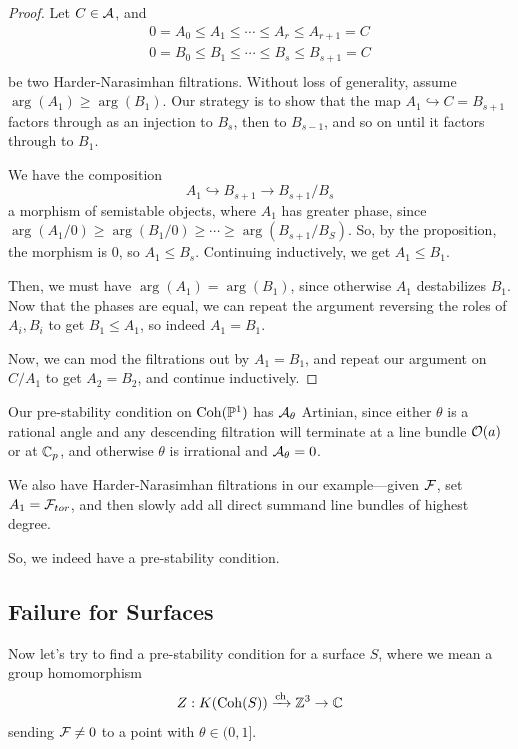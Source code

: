 \documentclass[12pt]{article}
\begin{document}
\begin{proof}
    Let $C\in \mathcal{A}$, and
    \begin{align*}
        0=A_0 \leq A_1 \leq \cdots \leq A_r \leq A_{r+1}=C\\
        0=B_0 \leq B_1 \leq \cdots \leq B_s \leq B_{s+1}=C\\
    \end{align*}
    be two Harder-Narasimhan filtrations. Without loss of generality, assume $\arg(A_1)\geq \arg(B_1)$. Our strategy is to show that the map $A_1 \hookrightarrow C=B_{s+1}$ factors through as an injection to $B_s$, then to $B_{s-1}$, and so on until it factors through to $B_1$.

    We have the composition
    \[A_1 \hookrightarrow B_{s+1} \to B_{s+1}/B_s\]
    a morphism of semistable objects, where $A_1$ has greater phase, since $\arg(A_1/0)\geq\arg(B_1/0)\geq \cdots \geq \arg(B_{s+1}/B_S)$. So, by the proposition, the morphism is 0, so $A_1\leq B_s$. Continuing inductively, we get $A_1\leq B_1$.
    
    Then, we must have $\arg(A_1) = \arg(B_1)$, since otherwise $A_1$ destabilizes $B_1$. Now that the phases are equal, we can repeat the argument reversing the roles of $A_i,B_i$ to get $B_1\leq A_1$, so indeed $A_1=B_1$.

    Now, we can mod the filtrations out by $A_1=B_1$, and repeat our argument on $C/A_1$ to get $A_2=B_2$, and continue inductively.
\end{proof}

\begin{eg}
    Our pre-stability condition on $\operatorname{Coh}(\mathbb{P}^1)$ has $\mathcal{A}_\theta$ Artinian, since either $\theta$ is a rational angle and any descending filtration will terminate at a line bundle $\mathcal{O}(a)$ or at $\mathbb{C}_p$, and otherwise $\theta$ is irrational and $\mathcal{A}_\theta = 0$.
    
    We also have Harder-Narasimhan filtrations in our example---given $\mathcal{F}$, set $A_1=\mathcal{F}_{tor}$, and then slowly add all direct summand line bundles of highest degree.

    So, we indeed have a pre-stability condition.
\end{eg}



\subsection{Failure for Surfaces}
Now let's try to find a pre-stability condition for a surface $S$, where we mean a group homomorphism
\[Z: K(\operatorname{Coh}(S)) \xrightarrow{\mathrm{ch}} \mathbb{Z}^3 \to \mathbb{C}\]
sending $\mathcal{F} \neq 0$ to a point with $\theta \in (0,1]$.
\end{document}
